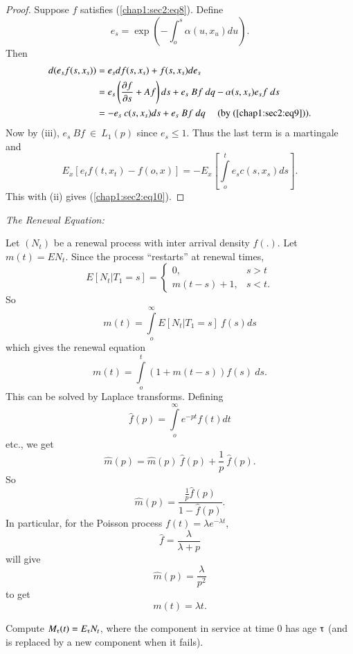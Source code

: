 \begin{proof}
Suppose $f$ satisfies (\ref{chap1:sec2:eq8}). Define
$$
e_s = \exp \left(-\int^s_o \alpha(u,x_u)du\right).
$$
Then
\begin{align*}
  d(e_sf(s,x_s)) & =  e_sdf(s,x_s) + f(s,x_s)de_s\\
  & = e_s\left(\frac{\partial f}{\partial s} + Af\right)ds + e_s ~ Bf ~ dq
  -\alpha (s, x_s)e_sf~ds\\ 
  & = -e_s ~ c(s,x_s)ds + e_s ~ Bf ~ dq ~\quad \text{(by
  (\ref{chap1:sec2:eq9}))}. 
\end{align*}
Now by (iii), $e_s ~ Bf ~ \in  ~ L_1(p)$ since $e_s \leq
1$. Thus the last term is a martingale and 
$$
E_x[e_tf(t,x_t)-f(o,x)] = - E_x\left[\int\limits_o^t e_sc(s,x_s)ds\right].
$$
This with (ii) gives (\ref{chap1:sec2:eq10}).
\end{proof}

\begin{example}%
  \textit{The Renewal Equation:}

  Let $(N_t)$ be a renewal process with inter arrival density
  $f(.)$. Let $m(t) = EN_t$. Since the process ``restarts'' at renewal
  times, 
  \begin{equation*}
    E[N_t | T_1 = s] = 
    \begin{cases}
      0, & s > t\\
      m(t-s)+1, & s < t.
    \end{cases}
  \end{equation*}
So
$$
m(t) = \int\limits^\infty_o E[N_t | T_1 = s] ~ f(s)ds
$$\pageoriginale
which gives the renewal equation
\begin{equation*}
m(t) = \int\limits^t_o (1+m(t-s)) f(s) ~ ds.\tag{11}\label{chap1:sec2:eq11}
\end{equation*}
This can be solved by Laplace transforms. Defining
$$
\hat{f}(p) = \int\limits^\infty_o e^{-pt} f(t) dt
$$
etc., we get 
$$
\hat{m}(p) = \hat{m}(p) ~ \hat{f}(p) + \frac{1}{p} ~ \hat{f}(p). 
$$
So   
$$
\hat{m}(p) = \frac{\frac{1}{p}\hat{f}(p)}{1 - \hat{f}(p)}.
$$
In particular, for the Poisson process $f(t) = \lambda e^{-\lambda
  t}$, 
$$
\hat{f} = \frac{\lambda}{\lambda + p}
$$
will give
$$
\hat{m} (p) = \frac{\lambda}{p^2}
$$
to get
$$
m(t) = \lambda t. 
$$
\end{example}

\begin{exercise}\label{chap1:exer2.4}%
  Compute $M_{\tauup}(t) = E_\tauup N_t$, where the component in
  service at time 0 has age $\tauup$ (and is replaced by a new
  component when it fails). 
\end{exercise}


